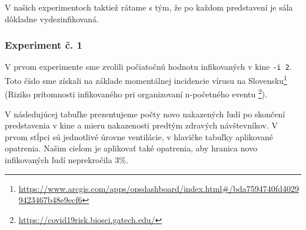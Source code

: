 \documentclass[a4paper, 11pt]{article}
\begin{document}
        V našich experimentoch taktiež rátame s tým, že po každom predstavení je sála dôkladne vydezinfikovaná.
        
        \subsubsection{Experiment č. 1}
        \label{sec:ex.1}
        V prvom experimente sme zvolili počiatočnú hodnotu infikovaných v kine \texttt{-i 2}. Toto číslo sme získali na základe momentálnej incidencie vírusu na Slovensku\footnote{\href{https://www.arcgis.com/apps/opsdashboard/index.html\#/bda7594740fd40299423467b48e9ecf6}{https://www.arcgis.com/apps/opsdashboard/index.html\#/bda7594740fd40299423467b48e9ecf6}} (Riziko prítomnosti infikovaného pri organizovaní n-početného eventu \footnote{\href{https://covid19risk.biosci.gatech.edu/}{https://covid19risk.biosci.gatech.edu/}}).
        
        \par V následujúcej tabuľke prezentujeme počty novo nakazených ľudí po skončení predstavenia v kine a mieru nakazenosti predtým zdravých návštevníkov. V prvom stĺpci sú jednotlivé úrovne ventilácie, v hlavičke tabuľky aplikované opatrenia. Našim cieĺom je aplikovať také opatrenia, aby hranica novo infikovaných ľudí neprekročila 3\%.
        
        \begin{table}[h]
        \end{table}
        
\end{document}
